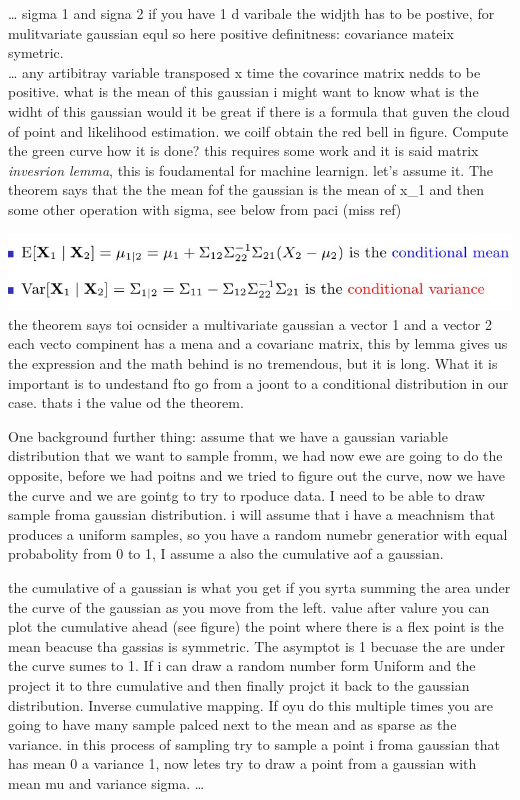 \documentclass[
  12pt,
  a4paper,
  oneside]{book}
\theoremstyle{definition}
\theoremstyle{definition}
\theoremstyle{definition}
\theoremstyle{remark}
\begin{document}
\ldots{}
sigma 1 and signa 2 if you have 1 d varibale the widjth has to be postive, for mulitvariate gaussian equl so here positive definitness: covariance mateix symetric.\\
\ldots{}
any artibitray variable transposed x time the covarince matrix nedds to be positive.
what is the mean of this gaussian i might want to know what is the widht of this gaussian would it be great if there is a formula that guven the cloud of point and likelihood estimation. we coilf obtain the red bell in figure.
Compute the green curve how it is done? this requires some work and it is said matrix \emph{invesrion lemma}, this is foudamental for machine learnign. let's assume it. The theorem says that the the mean fof the gaussian is the mean of x\_1 and then some other operation with sigma, see below from paci (miss ref)

\includegraphics{appendix_images/inverse_lemma.jpg}
the theorem says toi ocnsider a multivariate gaussian a vector 1 and a vector 2 each vecto compinent has a mena and a covarianc matrix, this by lemma gives us the expression and the math behind is no tremendous, but it is long. What it is important is to undestand fto go from a joont to a conditional distribution in our case. thats i the value od the theorem.

One background further thing: assume that we have a gaussian variable distribution that we want to sample fromm, we had now ewe are going to do the opposite, before we had poitns and we tried to figure out the curve, now we have the curve and we are gointg to try to rpoduce data. I need to be able to draw sample froma gaussian distribution. i will assume that i have a meachnism that produces a uniform samples, so you have a random numebr generatior with equal probabolity from 0 to 1, I assume a also the cumulative aof a gaussian.

the cumulative of a gaussian is what you get if you syrta summing the area under the curve of the gaussian as you move from the left. value after valure you can plot the cumulative ahead (see figure) the point where there is a flex point is the mean beacuse tha gassias is symmetric. The asymptot is 1 becuase the are under the curve sumes to 1.
If i can draw a random number form Uniform and the project it to thre cumulative and then finally projct it back to the gaussian distribution. Inverse cumulative mapping. If oyu do this multiple times you are going to have many sample palced next to the mean and as sparse as the variance. in this process of sampling try to sample a point i froma gaussian that has mean 0 a variance 1, now letes try to draw a point from a gaussian with mean mu and variance sigma. \ldots{}
\end{document}

